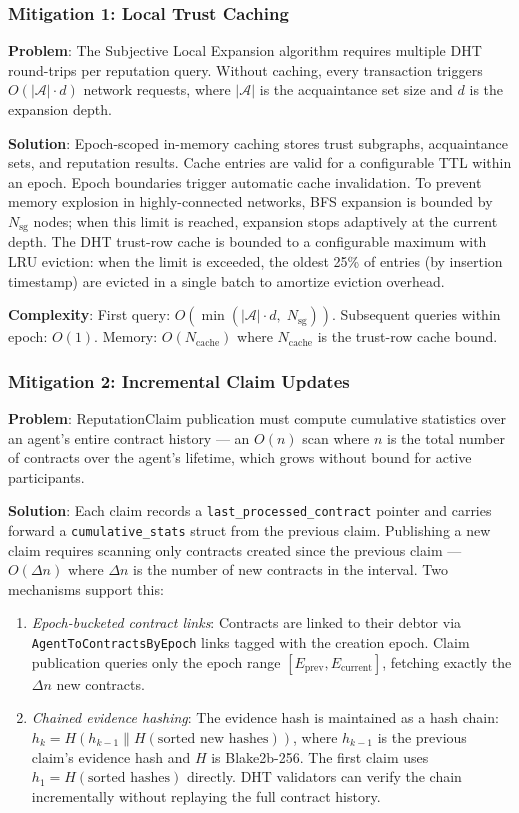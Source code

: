 \documentclass[11pt]{article}
\begin{document}
\subsubsection{Mitigation 1: Local Trust Caching}

\textbf{Problem}: The Subjective Local Expansion algorithm requires multiple DHT round-trips per reputation query. Without caching, every transaction triggers $O(|\mathcal{A}| \cdot d)$ network requests, where $|\mathcal{A}|$ is the acquaintance set size and $d$ is the expansion depth.

\textbf{Solution}: Epoch-scoped in-memory caching stores trust subgraphs, acquaintance sets, and reputation results. Cache entries are valid for a configurable TTL within an epoch. Epoch boundaries trigger automatic cache invalidation. To prevent memory explosion in highly-connected networks, BFS expansion is bounded by $N_{\text{sg}}$ nodes; when this limit is reached, expansion stops adaptively at the current depth. The DHT trust-row cache is bounded to a configurable maximum with LRU eviction: when the limit is exceeded, the oldest 25\% of entries (by insertion timestamp) are evicted in a single batch to amortize eviction overhead.

\textbf{Complexity}: First query: $O(\min(|\mathcal{A}| \cdot d,\; N_{\text{sg}}))$. Subsequent queries within epoch: $O(1)$. Memory: $O(N_{\text{cache}})$ where $N_{\text{cache}}$ is the trust-row cache bound.

\subsubsection{Mitigation 2: Incremental Claim Updates}

\textbf{Problem}: ReputationClaim publication must compute cumulative statistics over an agent's entire contract history --- an $O(n)$ scan where $n$ is the total number of contracts over the agent's lifetime, which grows without bound for active participants.

\textbf{Solution}: Each claim records a \texttt{last\_processed\_contract} pointer and carries forward a \texttt{cumulative\_stats} struct from the previous claim. Publishing a new claim requires scanning only contracts created since the previous claim --- $O(\Delta n)$ where $\Delta n$ is the number of new contracts in the interval. Two mechanisms support this:

\begin{enumerate}
    \item \emph{Epoch-bucketed contract links}: Contracts are linked to their debtor via \texttt{Agent\-To\-Contracts\-By\-Epoch} links tagged with the creation epoch. Claim publication queries only the epoch range $[E_{\text{prev}}, E_{\text{current}}]$, fetching exactly the $\Delta n$ new contracts.
    \item \emph{Chained evidence hashing}: The evidence hash is maintained as a hash chain: $h_k = H(h_{k-1} \| H(\text{sorted new hashes}))$, where $h_{k-1}$ is the previous claim's evidence hash and $H$ is Blake2b-256. The first claim uses $h_1 = H(\text{sorted hashes})$ directly. DHT validators can verify the chain incrementally without replaying the full contract history.
\end{enumerate}
\end{document}
